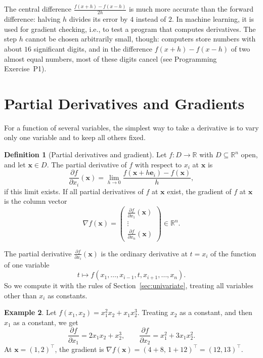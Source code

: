 \documentclass[11pt]{article}
\theoremstyle{definition}
\newtheorem{definition}{Definition}[section]
\newtheorem{example}[definition]{Example}
\theoremstyle{plain}
\theoremstyle{remark}
\begin{document}
The central difference $\frac{f(x + h) - f(x - h)}{2h}$ is much more accurate than the forward difference: halving $h$ divides its error by $4$ instead of $2$. In machine learning, it is used for gradient checking, i.e., to test a program that computes derivatives. The step $h$ cannot be chosen arbitrarily small, though: computers store numbers with about $16$ significant digits, and in the difference $f(x + h) - f(x - h)$ of two almost equal numbers, most of these digits cancel (see Programming Exercise~P1).

\section{Partial Derivatives and Gradients}\label{sec:gradients}

For a function of several variables, the simplest way to take a derivative is to vary only one variable and to keep all others fixed.

\begin{definition}[Partial derivatives and gradient]\label{def:partial}
    Let $f: D \to \mathbb{R}$ with $D \subseteq \mathbb{R}^n$ open, and let $\mathbf{x} \in D$. The partial derivative of $f$ with respect to $x_i$ at $\mathbf{x}$ is
    \[\frac{\partial f}{\partial x_i}(\mathbf{x}) = \lim_{h \to 0} \frac{f(\mathbf{x} + h\mathbf{e}_i) - f(\mathbf{x})}{h},\]
    if this limit exists. If all partial derivatives of $f$ at $\mathbf{x}$ exist, the gradient of $f$ at $\mathbf{x}$ is the column vector
    \[\nabla f(\mathbf{x}) = \begin{pmatrix} \frac{\partial f}{\partial x_1}(\mathbf{x}) \\ \vdots \\ \frac{\partial f}{\partial x_n}(\mathbf{x}) \end{pmatrix} \in \mathbb{R}^n.\]
\end{definition}

The partial derivative $\frac{\partial f}{\partial x_i}(\mathbf{x})$ is the ordinary derivative at $t = x_i$ of the function of one variable
\[t \mapsto f(x_1, \ldots, x_{i-1}, t, x_{i+1}, \ldots, x_n).\]
So we compute it with the rules of Section~\ref{sec:univariate}, treating all variables other than $x_i$ as constants.

\begin{example}\label{ex:partials}
    Let $f(x_1, x_2) = x_1^2 x_2 + x_1 x_2^3$. Treating $x_2$ as a constant, and then $x_1$ as a constant, we get
    \[\frac{\partial f}{\partial x_1} = 2x_1 x_2 + x_2^3, \qquad \frac{\partial f}{\partial x_2} = x_1^2 + 3x_1 x_2^2.\]
    At $\mathbf{x} = (1, 2)^\top$, the gradient is $\nabla f(\mathbf{x}) = (4 + 8, \, 1 + 12)^\top = (12, 13)^\top$.
\end{example}
\end{document}
